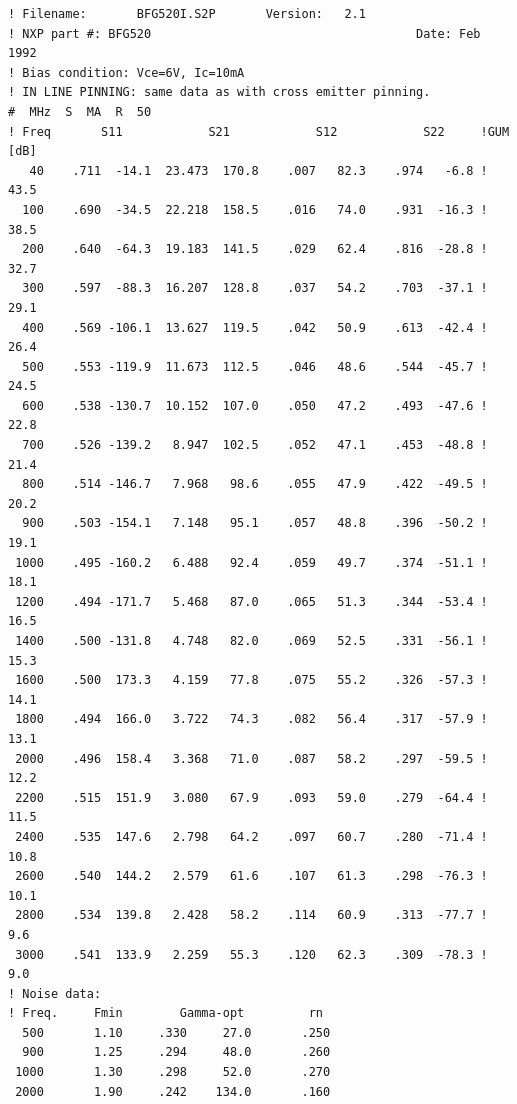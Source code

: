 \documentclass{article}
\begin{document}
\begin{verbatim}
! Filename:       BFG520I.S2P       Version:   2.1
! NXP part #: BFG520                                     Date: Feb 1992
! Bias condition: Vce=6V, Ic=10mA
! IN LINE PINNING: same data as with cross emitter pinning.
#  MHz  S  MA  R  50
! Freq       S11            S21            S12            S22     !GUM [dB]
   40    .711  -14.1  23.473  170.8    .007   82.3    .974   -6.8 !    43.5
  100    .690  -34.5  22.218  158.5    .016   74.0    .931  -16.3 !    38.5
  200    .640  -64.3  19.183  141.5    .029   62.4    .816  -28.8 !    32.7
  300    .597  -88.3  16.207  128.8    .037   54.2    .703  -37.1 !    29.1
  400    .569 -106.1  13.627  119.5    .042   50.9    .613  -42.4 !    26.4
  500    .553 -119.9  11.673  112.5    .046   48.6    .544  -45.7 !    24.5
  600    .538 -130.7  10.152  107.0    .050   47.2    .493  -47.6 !    22.8
  700    .526 -139.2   8.947  102.5    .052   47.1    .453  -48.8 !    21.4
  800    .514 -146.7   7.968   98.6    .055   47.9    .422  -49.5 !    20.2
  900    .503 -154.1   7.148   95.1    .057   48.8    .396  -50.2 !    19.1
 1000    .495 -160.2   6.488   92.4    .059   49.7    .374  -51.1 !    18.1
 1200    .494 -171.7   5.468   87.0    .065   51.3    .344  -53.4 !    16.5
 1400    .500 -131.8   4.748   82.0    .069   52.5    .331  -56.1 !    15.3
 1600    .500  173.3   4.159   77.8    .075   55.2    .326  -57.3 !    14.1
 1800    .494  166.0   3.722   74.3    .082   56.4    .317  -57.9 !    13.1
 2000    .496  158.4   3.368   71.0    .087   58.2    .297  -59.5 !    12.2
 2200    .515  151.9   3.080   67.9    .093   59.0    .279  -64.4 !    11.5
 2400    .535  147.6   2.798   64.2    .097   60.7    .280  -71.4 !    10.8
 2600    .540  144.2   2.579   61.6    .107   61.3    .298  -76.3 !    10.1
 2800    .534  139.8   2.428   58.2    .114   60.9    .313  -77.7 !     9.6
 3000    .541  133.9   2.259   55.3    .120   62.3    .309  -78.3 !     9.0
! Noise data:
! Freq.     Fmin        Gamma-opt         rn
  500       1.10     .330     27.0       .250
  900       1.25     .294     48.0       .260
 1000       1.30     .298     52.0       .270
 2000       1.90     .242    134.0       .160

\end{verbatim}
\hspace{1em}\\
\hspace{1em}\\
\hspace{1em}\\
\hspace{1em}\\
\end{document}
